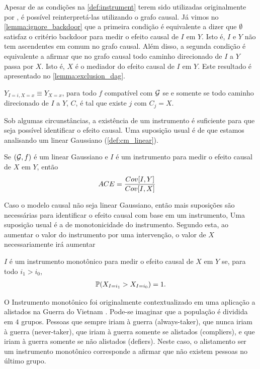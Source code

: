 Apesar de as condições na \cref{def:instrument} terem sido
utilizadas originalmente por \citet{Angrist1996},
é possível reinterpretá-las utilizando o grafo causal.
Já vimos no \cref{lemma:ignore_backdoor} que
a primeira condição é equivalente a dizer que
$\emptyset$ satisfaz o critério backdoor para 
medir o efeito causal de $I$ em $Y$.
Isto é, $I$ e $Y$ não tem 
ascendentes em comum no grafo causal.
Além disso, a segunda condição é
equivalente a afirmar que no grafo causal
todo caminho direcionado de $I$ a $Y$
passa por $X$. Isto é,
$X$ é o mediador do efeito causal de $I$ em $Y$.
Este resultado é apresentado no \cref{lemma:exclusion_dag}.

\begin{lemma}
 \label{lemma:exclusion_dag}
 $Y_{I=i, X=x} \equiv Y_{X=x}$,
 para todo $f$ compatível com $\sG$ se e somente se
 todo caminho direcionado de $I$ a $Y$, $C$,
 é tal que existe $j$ com $C_j = X$.
\end{lemma}

Sob algumas circunstâncias,
a existência de um instrumento é
suficiente para que
seja possível identificar o efeito causal.
Uma suposição usual é de que
estamos analisando um
\CM linear Gaussiano (\cref{def:cm_linear}).

\begin{theorem}
 \label{thm:linear_instrument}
 Se $(\sG,f)$ é um \CM linear Gaussiano e
 $I$ é um instrumento para
 medir o efeito causal de $X$ em $Y$, então
 \begin{align*}
  \ACE &= \frac{Cov[I,Y]}{Cov[I,X]}
 \end{align*}
\end{theorem}

Caso o modelo causal não seja linear Gaussiano,
então mais suposições são necessárias
para identificar o efeito causal 
com base em um instrumento,
Uma suposição usual é
a de monotonicidade do instrumento.
Segundo esta, ao aumentar 
o valor do instrumento por uma intervenção,
o valor de $X$ necessariamente irá aumentar

\begin{definition}
 \label{def:monotone}
 $I$ é um instrumento monotônico para
 medir o efeito causal de $X$ em $Y$ se,
 para todo $i_1 > i_0$,
 \begin{align*}
  \P(X_{I = i_1} > X_{I = i_0}) = 1.
 \end{align*}
\end{definition}

O Instrumento monotônico foi originalmente contextualizado
em uma aplicação a alistados na Guerra do Vietnam \cite{Angrist1990}.
Pode-se imaginar que a população é dividida em $4$ grupos.
Pessoas que sempre iriam à guerra (always-taker),
que nunca iriam à guerra (never-taker),
que iriam à guerra somente se alistados (compliers),
e que iriam à guerra somente se não alistados (defiers).
Neste caso, o alistamento ser um instrumento monotônico corresponde
a afirmar que não existem pessoas no último grupo.

